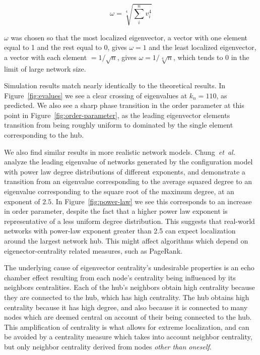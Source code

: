 \documentclass[twocolumn,prl,superscriptaddress]{revtex4}
\newcommand{\etal}{{\it{}et~al.}}
\begin{document}
\begin{equation}
  \omega = \sqrt[4]{\sum_i^n v_i ^ 4}
\end{equation}

$\omega$ was chosen so that the most localized eigenvector, a vector with one element equal to 1 and the rest equal to 0, gives $\omega = 1$ and the least localized eigenvector, a vector with each element $= 1/\sqrt{n}$, gives $\omega = 1/\sqrt[4]{n}$, which tends to 0 in the limit of large network size. 

Simulation results match nearly identically to the theoretical results. In Figure~\ref{fig:evalues} we see a clear crossing of eigenvalues at $k_n = 110$, as predicted. We also see a sharp phase transition in the order parameter at this point in Figure~\ref{fig:order-parameter}, as the leading eigenvector elements transition from being roughly uniform to dominated by the single element corresponding to the hub.

We also find similar results in more realistic network models. Chung~\etal~\cite{chung03} analyze the leading eigenvalue of networks generated by the configuration model with power law degree distributions of different exponents, and demonstrate a transition from an eigenvalue corresponding to the average squared degree to an eigenvalue corresponding to the square root of the maximum degree, at an exponent of $2.5$. In Figure~\ref{fig:power-law} we see this corresponds to an increase in order parameter, despite the fact that a higher power law exponent is representative of a less uniform degree distribution. This suggests that real-world networks with power-law exponent greater than 2.5 can expect localization around the largest network hub. This might affect algorithms which depend on eigenector-centrality related measures, such as PageRank.


The underlying cause of eigenvector centrality's undesirable properties is an echo chamber effect resulting from each node's centrality being influenced by its neighbors centralities. Each of the hub's neighbors obtain high centrality because they are connected to the hub, which has high centrality. The hub obtains high centrality because it has high degree, and also because it is connected to many nodes which are deemed central on account of their being connected to the hub. This amplification of centrality is what allows for extreme localization, and can be avoided by a centrality measure which takes into account neighbor centrality, but only neighbor centrality derived from nodes \emph{other than oneself}.
\end{document}
